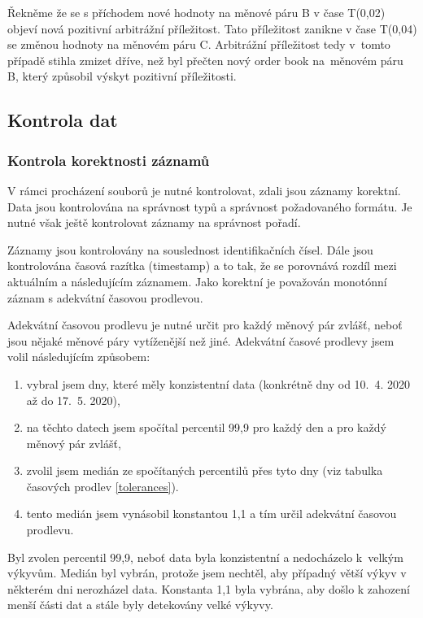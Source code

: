 \documentclass[thesis=B,czech]{FITthesis}[2019/03/21]
\begin{document}
Řekněme že se s příchodem nové hodnoty na měnové páru B v čase T(0,02) objeví nová pozitivní arbitrážní příležitost. Tato příležitost zanikne v čase T(0,04) se změnou hodnoty na měnovém páru C. Arbitrážní příležitost tedy v~tomto případě stihla zmizet dříve, než byl přečten nový order book na~měnovém páru B, který způsobil výskyt pozitivní příležitosti. 
\subsection{Kontrola dat}
\subsubsection{Kontrola korektnosti záznamů}
\label{section:kontrola_korektnosti_zaznamu}
V rámci procházení souborů je nutné kontrolovat, zdali jsou záznamy korektní. Data jsou kontrolována na správnost typů a správnost požadovaného formátu. Je nutné však ještě kontrolovat záznamy na správnost pořadí.

Záznamy jsou kontrolovány na souslednost identifikačních čísel. Dále jsou kontrolována časová razítka (timestamp) a to tak, že se porovnává rozdíl mezi aktuálním a následujícím záznamem. Jako korektní je považován monotónní záznam s adekvátní časovou prodlevou. 

Adekvátní časovou prodlevu je nutné určit pro každý měnový pár zvlášť, neboť jsou nějaké měnové páry vytíženější než jiné. Adekvátní časové prodlevy jsem volil následujícím způsobem:

\begin{enumerate}
    \item vybral jsem dny, které měly konzistentní data (konkrétně dny od 10.~4. 2020 až do 17.~5. 2020),
    \item na těchto datech jsem spočítal percentil 99,9 pro každý den a pro každý měnový pár zvlášť,
    \item zvolil jsem medián ze spočítaných percentilů přes tyto dny (viz tabulka časových prodlev \ref{tolerances}).
    \item tento medián jsem vynásobil konstantou 1,1 a tím určil adekvátní časovou prodlevu.
\end{enumerate}

Byl zvolen percentil 99,9, neboť data byla konzistentní a nedocházelo k~velkým výkyvům. Medián byl vybrán, protože jsem nechtěl, aby případný větší výkyv v některém dni nerozházel data. Konstanta 1,1 byla vybrána, aby došlo k zahození menší části dat a stále byly detekovány velké výkyvy.
\end{document}
